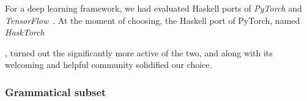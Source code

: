 \documentclass{article}
\begin{document}
For a deep learning framework, we had evaluated Haskell ports of
\emph{PyTorch} and \emph{TensorFlow}~\citep{abadi2016tensorflow}.
At the moment of choosing, the Haskell port of PyTorch,
named \emph{HaskTorch}~\citep{hasktorch}%


,
turned out the significantly more active of the two,
and along with its welcoming and helpful community solidified our choice.

\subsubsection{Grammatical subset} \label{sec:grammar}


\end{document}
